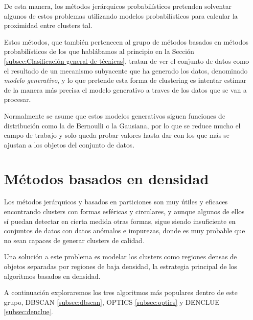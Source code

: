 \documentclass[10pt, a4paper]{article}
\begin{document}
De esta manera, los métodos jerárquicos probabilísticos pretenden solventar algunos de estos problemas utilizando modelos probabilísticos para calcular la proximidad entre clusters tal.

Estos métodos, que también pertenecen al grupo de métodos basados en métodos probabilísticos de los que hablábamos al principio en la Sección \ref{subsec:Clasificación general de técnicas}, tratan de ver el conjunto de datos como el resultado de un mecanismo subyacente que ha generado los datos, denominado \textit{modelo generativo}, y lo que pretende esta forma de clustering es intentar estimar de la manera más precisa el modelo generativo a traves de los datos que se van a procesar. 

Normalmente se asume que estos modelos generativos siguen funciones de distribución como la de Bernoulli o la Gausiana, por lo que se reduce mucho el campo de trabajo y solo queda probar valores hasta dar con los que más se ajustan a los objetos del conjunto de datos. 



\section{Métodos basados en densidad} \label{sec:Métodos basados en densidad}


\cite{LIBRO} Los métodos jerárquicos y basados en particiones son muy útiles y eficaces encontrando clusters con formas esféricas y circulares, y aunque algunos de ellos sí puedan detectar en cierta medida otras formas, sigue siendo insuficiente en conjuntos de datos con datos anómalos e impurezas, donde es muy probable que no sean capaces de generar clusters de calidad.

Una solución a este problema es modelar los clusters como regiones densas de objetos separadas por regiones de baja densidad, la estrategia principal de los algoritmos basados en densidad. 

A continuación exploraremos los tres algoritmos más populares dentro de este grupo, DBSCAN \ref{subsec:dbscan}, OPTICS \ref{subsec:optics} y DENCLUE \ref{subsec:denclue}.
\end{document}
